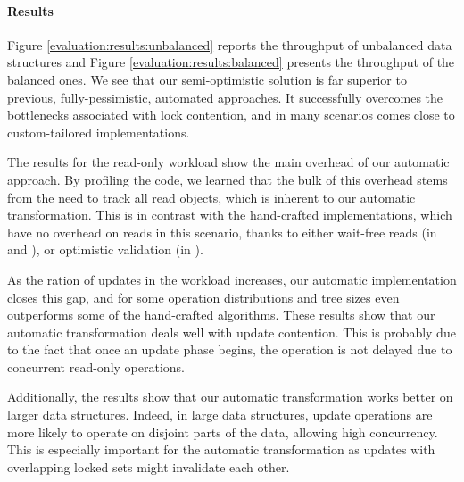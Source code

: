 \paragraph{Results} Figure \ref{evaluation:results:unbalanced} 
reports the throughput of unbalanced data structures and Figure 
\ref{evaluation:results:balanced} presents
the throughput of the balanced ones. We see that our semi-optimistic
solution is far superior to previous, fully-pessimistic, 
automated approaches. It successfully overcomes the bottlenecks
associated with lock contention, and in many scenarios comes close
to custom-tailored implementations.

The results for the read-only workload show the main overhead
of our automatic approach. By profiling the code, we learned 
that the bulk of this overhead stems from the need to track all read objects,
which is inherent to our automatic transformation. 
This is in contrast with the hand-crafted implementations,
which have no overhead on reads in this scenario, thanks to either 
wait-free reads (in \danaTree and \danaAVL), or optimistic validation (in \bronson). 
 
As the ration of updates in the workload increases, our automatic implementation 
closes this gap, and for some operation distributions and 
tree sizes even outperforms some of the hand-crafted algorithms.
These results show that our automatic transformation deals well with update contention. 
This is probably due to the fact that once
an update phase begins, the operation is not delayed due to concurrent 
read-only operations. 

Additionally, the results show that our automatic transformation 
works better on larger data structures. Indeed, in large data structures, 
update operations are more likely to operate on disjoint parts of 
the data, allowing high concurrency. This is especially important 
for the automatic transformation as updates  with overlapping 
locked sets might invalidate each other.  
 


